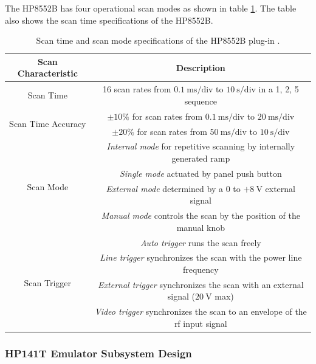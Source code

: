 \documentclass[class=report,11pt,crop=false]{standalone}
\begin{document}
	The HP8552B has four operational scan modes as shown in table \ref{tab:scan-specifications}. The table also shows the scan time specifications of the HP8552B. 
	
	\begin{table}[ht!]
		\centering
		\label{tab:scan-specifications}
		\begin{tabular}{|c|c|}
			\hline
			\cellcolor{cyan!25}\textbf{Scan Characteristic}	& \cellcolor{cyan!25}\textbf{Description} \\
			\hline
			Scan Time	& 16 scan rates from $\SI{0.1}{\milli\second}/\text{div}$ to $\SI{10}{\second}/\text{div}$ in a 1, 2, 5 sequence\\
			\hline
			\multirow{2}{*}{Scan Time Accuracy} & $\pm10\%$ for scan rates from $\SI{0.1}{\milli\second}/\text{div}$ to $\SI{20}{\milli\second}/\text{div}$\\
			\cline{2-2}
												& $\pm20\%$ for scan rates from $\SI{50}{\milli\second}/\text{div}$ to $\SI{10}{\second}/\text{div}$\\
			\hline
			\multirow{4}{*}{Scan Mode}	& \textit{Internal mode} for repetitive scanning by internally generated ramp	\\
			\cline{2-2}
										& \textit{Single mode} actuated by panel push button\\
			\cline{2-2}
										& \textit{External mode} determined by a $0$ to $+\SI{8}{\volt}$ external signal\\
			\cline{2-2}
										& \textit{Manual mode} controls the scan by the position of the manual knob\\
			\hline
			\multirow{4}{*}{Scan Trigger}	& \textit{Auto trigger} runs the scan freely\\
			\cline{2-2}
											&  \textit{Line trigger} synchronizes the scan with the power line frequency\\
			\cline{2-2}
											& \textit{External trigger} synchronizes the scan with an external signal ($\SI{20}{\volt}$ max) \\
			\cline{2-2}
											& \textit{Video trigger} synchronizes the scan to an envelope of the \acrshort{rf} input signal\\ 
			\hline
		\end{tabular}
		\caption{Scan time and scan mode specifications of the HP8552B plug-in \cite{hp8552b}.}
	\end{table}
		
	\subsubsection{HP141T Emulator Subsystem Design}
	
\end{document}
